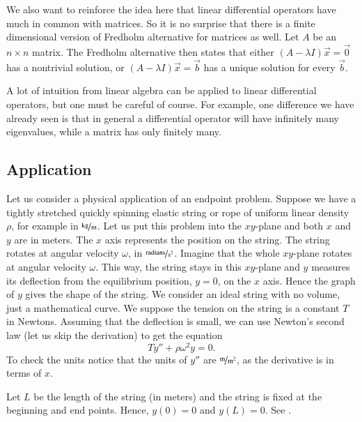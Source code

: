 We also want to reinforce the idea here that linear differential operators have
much in common with matrices.  So it is no surprise that
there is a finite dimensional version of Fredholm alternative for matrices as
well.  Let $A$ be an $n \times n$ matrix.  The Fredholm alternative then
states that either $(A-\lambda I) \vec{x}
= \vec{0}$ has a nontrivial solution, or $(A-\lambda I) \vec{x} = \vec{b}$
has a unique solution for every $\vec{b}$.

A lot of intuition from linear algebra can be applied to linear differential
operators, but one must be careful of course.  For example, one 
difference we have already seen is that in general a differential operator
will have infinitely many eigenvalues, while a matrix has only finitely many.

\subsection{Application}

Let us consider a physical application of an endpoint problem.
Suppose we have a tightly stretched quickly spinning elastic
string or rope of uniform linear density $\rho$, for example in
$\unitfrac{kg}{m}$.
Let us put this problem into the $xy$-plane and both $x$ and $y$
are in meters.  The $x$ axis represents the
position on the string.  The string rotates at angular velocity $\omega$,
in $\unitfrac{radians}{s^2}$.
Imagine that the whole $xy$-plane rotates at angular velocity $\omega$.
This way, the string stays in this $xy$-plane and $y$ 
measures its deflection from the equilibrium position, $y=0$, on the $x$ axis.
Hence the graph of $y$ gives the shape of the string.
We consider an ideal string with
no volume, just a mathematical curve.
We suppose the tension on the string is a constant $T$ in Newtons.
Assuming that the deflection is small,
we can use Newton's second law (let us skip the derivation) to get the equation
\begin{equation*}
T y'' + \rho \omega^2 y = 0 .
\end{equation*}
To check the units notice that the units of $y''$ are $\unitfrac{m}{m^2}$, as the derivative is
in terms of $x$.

Let $L$ be the length of the string (in meters) and the string
is fixed at the beginning and end
points.  Hence, $y(0) = 0$ and $y(L) = 0$.  See
.

